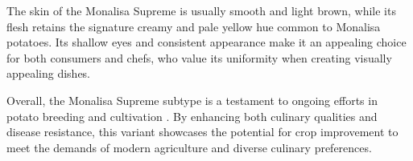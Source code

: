 \documentclass[../../../../main.tex]{subfiles}
\begin{document}
The skin of the Monalisa Supreme is usually smooth and light brown, while its flesh retains the signature creamy and pale yellow hue common to Monalisa potatoes. Its shallow eyes and consistent appearance make it an appealing choice for both consumers and chefs, who value its uniformity when creating visually appealing dishes. \citep{yan_isotropic_2008}

Overall, the Monalisa Supreme subtype is a testament to ongoing efforts in potato breeding and cultivation \cite{du_vector-based_2017}. By enhancing both culinary qualities and disease resistance, this variant showcases the potential for crop improvement to meet the demands of modern agriculture and diverse culinary preferences.








\end{document}
